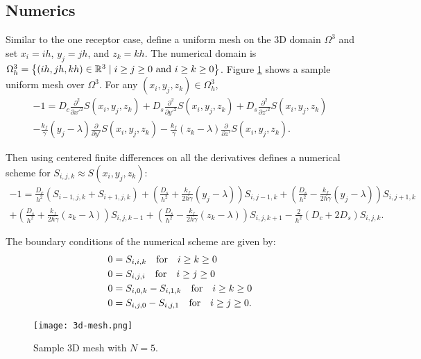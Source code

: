 \documentclass{article}
\newcommand{\tn}{\textnormal}
\newcommand{\stiff}{\frac{k_f}{\gamma}}
\newcommand{\Pder}[2]{\frac{\partial #1}{\partial #2}}
\def\R{\mathbb{R}}
\begin{document}
\subsection{Numerics}
\label{sec:numerics-2receptors}

Similar to the one receptor case, define a uniform mesh on the 3D
domain $\Omega^3$ and set $x_i = ih$, $y_j = jh$, and $z_k = kh$. The
numerical domain is $\Omega^3_h = \left\{(ih, jh, kh) \in \R^3 \mid i \ge
  j \ge 0 \tn{ and }i \ge k \ge 0\right\}$. Figure \ref{fig:3d-mesh}
shows a sample uniform mesh over $\Omega^3$. For any $(x_i, y_j, z_k)
\in \Omega^3_h$,
\begin{multline}
  -1 = D_c \frac{\partial^2}{\partial x'^2}S(x_i, y_j, z_k) + D_s
  \frac{\partial^2}{\partial y'^2} S(x_i, y_j, z_k) + D_s
  \frac{\partial^2}{\partial z'^2} S(x_i, y_j, z_k) \\
  - \stiff(y_j - \lambda) \Pder{}{y'}S(x_i, y_j, z_k) - \stiff(z_k -
  \lambda) \Pder{}{z'}S(x_i, y_j, z_k).
\end{multline}

Then using centered finite differences on all the derivatives defines
a numerical scheme for $S_{i, j, k} \approx S(x_i, y_j, z_k)$:
\begin{multline}
  -1 = \frac{D_c}{h^2} \left(S_{i-1, j, k} + S_{i+1, j, k} \right) +
  \left( \frac{D_s}{h^2} + \frac{k_f}{2h\gamma}(y_j - \lambda) \right)
  S_{i, j-1, k} + \left( \frac{D_s}{h^2} - \frac{k_f}{2h\gamma}(y_j -
    \lambda) \right) S_{i, j+1, k} \\
  + \left( \frac{D_s}{h^2} + \frac{k_f}{2h\gamma}(z_k - \lambda)
  \right) S_{i, j, k-1} + \left( \frac{D_s}{h^2} -
    \frac{k_f}{2h\gamma}(z_k - \lambda) \right) S_{i, j, k+1} -
  \frac{2}{h^2}(D_c + 2D_s) S_{i, j, k}.
\end{multline}

The boundary conditions of the numerical scheme are given by:
\begin{align}
  0 &= S_{i,i,k} \quad \tn{for} \quad i \ge k \ge 0 \\
  0 &= S_{i,j,i} \quad \tn{for} \quad i \ge j \ge 0 \\
  0 &= S_{i,0,k} - S_{i,1,k} \quad \tn{for} \quad i \ge k \ge 0 \\
  0 &= S_{i,j,0} - S_{i,j,1} \quad \tn{for} \quad i \ge j \ge 0.
\end{align}

\begin{figure}[h]
  \centering
  \texttt{[image: 3d-mesh.png]}
  \caption{Sample 3D mesh with $N = 5$.}
  \label{fig:3d-mesh}
\end{figure}
\end{document}
